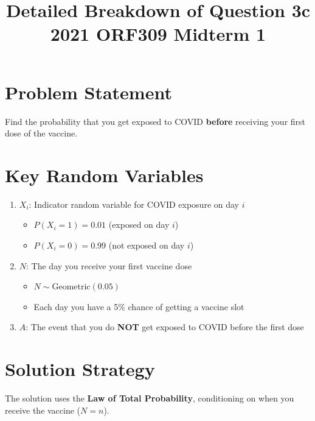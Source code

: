 \documentclass[11pt]{article}
\title{Detailed Breakdown of Question 3c\\2021 ORF309 Midterm 1}
\author{}
\date{}
\begin{document}
\maketitle

\section{Problem Statement}

Find the probability that you get exposed to COVID \textbf{before} receiving your first dose of the vaccine.

\section{Key Random Variables}

\begin{tcolorbox}[colback=blue!5!white,colframe=blue!75!black,title=Random Variables]
\begin{enumerate}[label=\textbf{\arabic*.}]
    \item $X_i$: Indicator random variable for COVID exposure on day $i$
    \begin{itemize}
        \item $P(X_i = 1) = 0.01$ (exposed on day $i$)
        \item $P(X_i = 0) = 0.99$ (not exposed on day $i$)
    \end{itemize}

    \item $N$: The day you receive your first vaccine dose
    \begin{itemize}
        \item $N \sim \text{Geometric}(0.05)$
        \item Each day you have a 5\% chance of getting a vaccine slot
    \end{itemize}

    \item $A$: The event that you do \textbf{NOT} get exposed to COVID before the first dose
\end{enumerate}
\end{tcolorbox}

\section{Solution Strategy}

The solution uses the \textbf{Law of Total Probability}, conditioning on when you receive the vaccine ($N = n$).
\end{document}
